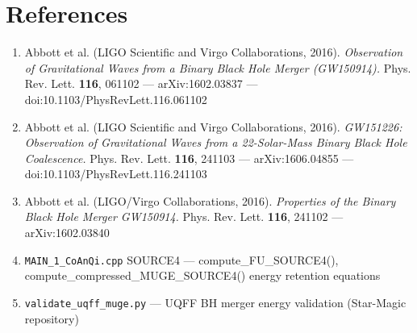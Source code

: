 \documentclass[11pt]{article}
\begin{document}
\section*{References}

\begin{enumerate}
  \item Abbott et al. (LIGO Scientific and Virgo Collaborations, 2016). \emph{Observation of Gravitational Waves from a Binary Black Hole Merger (GW150914).} Phys. Rev. Lett. \textbf{116}, 061102 --- arXiv:1602.03837 --- doi:10.1103/PhysRevLett.116.061102
  \item Abbott et al. (LIGO Scientific and Virgo Collaborations, 2016). \emph{GW151226: Observation of Gravitational Waves from a 22-Solar-Mass Binary Black Hole Coalescence.} Phys. Rev. Lett. \textbf{116}, 241103 --- arXiv:1606.04855 --- doi:10.1103/PhysRevLett.116.241103
  \item Abbott et al. (LIGO/Virgo Collaborations, 2016). \emph{Properties of the Binary Black Hole Merger GW150914.} Phys. Rev. Lett. \textbf{116}, 241102 --- arXiv:1602.03840
  \item \verb|MAIN_1_CoAnQi.cpp| SOURCE4 --- compute\_FU\_SOURCE4(), compute\_compressed\_MUGE\_SOURCE4() energy retention equations
  \item \verb|validate_uqff_muge.py| --- UQFF BH merger energy validation (Star-Magic repository)
\end{enumerate}


\end{document}
